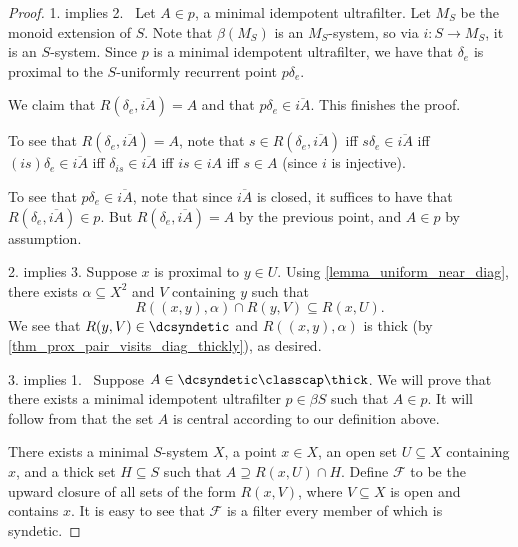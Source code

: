 \begin{proof}
    1. implies 2. \ Let $A \in p$, a minimal idempotent ultrafilter.  Let $M_S$ be the monoid extension of $S$.  Note that $\beta (M_S)$ is an $M_S$-system, so via $i: S \to M_S$, it is an $S$-system.  Since $p$ is a minimal idempotent ultrafilter, we have that $\delta_e$ is proximal to the $S$-uniformly recurrent point $p \delta_e$.
    
    We claim that $R(\delta_e, \overline{iA}) = A$ and that $p \delta_e \in \overline{iA}$.  This finishes the proof.
    
    To see that $R(\delta_e, \overline{iA}) = A$, note that $s \in R(\delta_e, \overline{iA})$ iff $s \delta_e \in \overline{iA}$ iff $(is) \delta_e \in \overline{iA}$ iff $\delta_{is} \in \overline{iA}$ iff $is \in iA$ iff $s \in A$ (since $i$ is injective).

    To see that $p \delta_e \in \overline{iA}$, note that since $\overline{iA}$ is closed, it suffices to have that $R(\delta_e,\overline{iA}) \in p$.  But $R(\delta_e,\overline{iA}) = A$ by the previous point, and $A \in p$ by assumption.

    2. implies 3. Suppose $x$ is proximal to $y \in U$.  Using \cref{lemma_uniform_near_diag}, there exists $\alpha \subseteq X^2$ and $V$ containing $y$ such that
    \[R((x,y),\alpha) \cap R(y,V) \subseteq R(x,U).\]
    We see that $R(y,V) \in \dcsyndetic$ and $R((x,y), \alpha)$ is thick (by \cref{thm_prox_pair_visits_diag_thickly}), as desired.

    3. implies 1. \ Suppose $A \in \dcsyndetic \classcap \thick$.  We will prove that there exists a minimal idempotent ultrafilter $p \in \beta S$ such that $A \in p$.  It will follow from \cite[Thm. 19.27]{hindman_strauss_book_2012} that the set $A$ is central according to our definition above.

    There exists a minimal $S$-system $X$, a point $x \in X$, an open set $U \subseteq X$ containing $x$, and a thick set $H \subseteq S$ such that $A \supseteq R(x,U) \cap H$.  Define $\mathscr{F}$ to be the upward closure of all sets of the form $R(x,V)$, where $V \subseteq X$ is open and contains $x$.
    It is easy to see that $\mathscr{F}$ is a filter every member of which is syndetic.
    

\end{proof}
